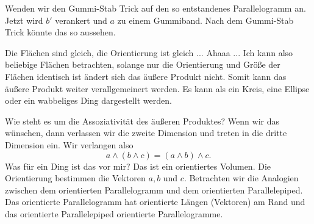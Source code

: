 \documentclass[fleqn]{scrartcl}
\numberwithin{equation}{section}
\begin{document}
Wenden wir den Gummi-Stab Trick auf den so entstandenes Parallelogramm an.
Jetzt wird $b'$ verankert und $a$ zu einem Gummiband. Nach dem Gummi-Stab
Trick könnte das so aussehen.
\begin{center}
\begin{minipage}{\linewidth}
\centering
{}
\label{fig:shiftshift}
\end{minipage}
\end{center}

Die Flächen sind gleich, die Orientierung ist gleich ... Ahaaa ... Ich kann
also beliebige Flächen betrachten, solange nur die Orientierung und Größe der
Flächen identisch ist ändert sich das äußere Produkt nicht. Somit kann das
äußere Produkt weiter verallgemeinert werden. Es kann als ein Kreis, eine
Ellipse oder ein wabbeliges Ding dargestellt werden.

Wie steht es um die Assoziativität des äußeren Produktes? Wenn wir das
wünschen, dann verlassen wir die zweite Dimension und treten in die dritte
Dimension ein. Wir verlangen also
\[a\wedge(b\wedge c) =(a\wedge b)\wedge c.\]
Was für ein Ding ist das vor mir? Das ist ein orientiertes Volumen. Die
Orientierung bestimmen die Vektoren $a, b$ und $c$. Betrachten wir die
Analogien zwischen dem orientierten Parallelogramm und dem orientierten
Parallelepiped. Das orientierte Parallelogramm hat orientierte Längen
(Vektoren) am Rand und das orientierte Parallelepiped orientierte
Parallelogramme.
\end{document}

